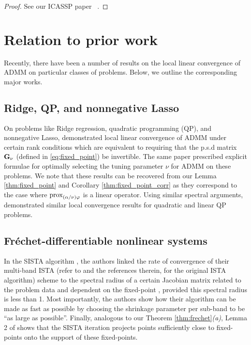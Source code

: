\begin{proof}
  See our ICASSP paper ~\citep{dohmatob2015local}.
\end{proof}

\section{Relation to prior work}
\label{sec:lit}
Recently, there have been a number of results on the local
linear convergence of ADMM on particular classes of problems. Below,
we outline the corresponding major works.

\subsection{{Ridge, QP, and nonnegative Lasso}} On problems like
Ridge regression, quadratic programming (QP), and
nonnegative Lasso, \citep{ghadimi2013optimal} demonstrated local linear
convergence of ADMM under certain rank conditions which
are equivalent to requiring that the p.s.d matrix $\mathbf{G}_\nu$ (defined in
\eqref{eq:fixed_point}) be invertible. The same paper
prescribed explicit formulae for optimally selecting the tuning
parameter $\nu$ for ADMM on these problems. %
We note that these results can be recovered from our Lemma
\ref{thm:fixed_point} and Corollary \ref{thm:fixed_point_corr} as they
correspond to the case where
$\operatorname{prox}_{(\alpha/\nu)\varphi}$ is a linear operator. Using
similar spectral arguments, \citep{boley2013} demonstrated similar
local convergence results for quadratic and linear QP problems.

\subsection{{Fr\'echet-differentiable nonlinear systems}} In the SISTA
algorithm \citep{bayram2010subband},
the authors linked the rate of convergence of their multi-band
ISTA (refer to \citep{daubechies2004} and the references therein,
for the original ISTA algorithm)
 scheme to the spectral radius of a certain Jacobian matrix related to
 the problem data and dependent on the fixed-point \cite[Propositions
   6 and  7]{bayram2010subband}, provided this spectral radius is less
 than 1.
Most importantly, the authors show \cite[Proposition
   8]{bayram2010subband} how their algorithm can be made as fast as
 possible by choosing the shrinkage parameter per sub-band to be ``as
 large as possible''. Finally, analogous to our Theorem
\ref{thm:frechet}\textit{(a)}, Lemma 2 of \citep{bayram2010subband}
shows that the SISTA iteration projects points sufficiently close to
fixed-points onto the support of these fixed-points. 

